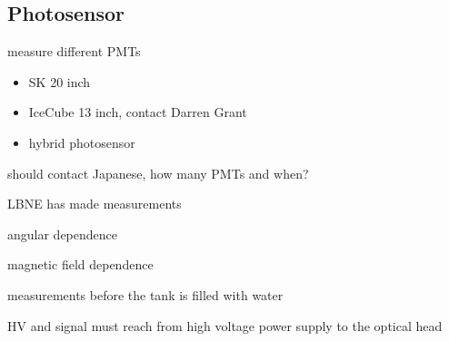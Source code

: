 \subsection{Photosensor}

measure different PMTs
\begin{itemize}
\item SK 20 inch
\item IceCube 13 inch, contact Darren Grant
\item hybrid photosensor
\end{itemize}

should contact Japanese, how many PMTs and when?

LBNE has made measurements

angular dependence

magnetic field dependence


measurements before the tank is filled with water

HV and signal must reach from high voltage power supply to the optical
head

